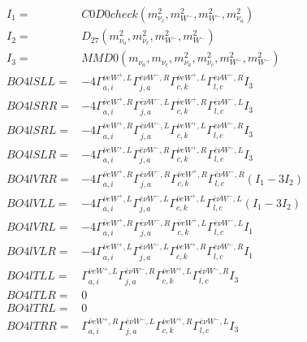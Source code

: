 \documentclass[A4,landscape]{article}
\begin{document}
\begin{align} 
I_1 = & C0D0check(m^2_{\nu_{{c}}}, m^2_{W^-}, m^2_{W^-}, m^2_{\nu_{{a}}}) \\ 
I_2 = & D_{27}(m^2_{\nu_{{a}}}, m^2_{\nu_{{c}}}, m^2_{W^-}, m^2_{W^-}) \\ 
I_3 = & MMD0(m_{\nu_{{a}}}, m_{\nu_{{c}}}, m^2_{\nu_{{a}}}, m^2_{\nu_{{c}}}, m^2_{W^-}, m^2_{W^-}) \\ 
  BO4lSLL= & -4  \Gamma^{\bar{\nu}e W^+,L}_{a, i} \Gamma^{\bar{e}\nu W^- ,R}_{j, a} \Gamma^{\bar{\nu}e W^+,L}_{c, k} \Gamma^{\bar{e}\nu W^- ,R}_{l, c} I_3 \\ 
  BO4lSRR= & -4  \Gamma^{\bar{\nu}e W^+,R}_{a, i} \Gamma^{\bar{e}\nu W^- ,L}_{j, a} \Gamma^{\bar{\nu}e W^+,R}_{c, k} \Gamma^{\bar{e}\nu W^- ,L}_{l, c} I_3 \\ 
  BO4lSRL= & -4  \Gamma^{\bar{\nu}e W^+,R}_{a, i} \Gamma^{\bar{e}\nu W^- ,L}_{j, a} \Gamma^{\bar{\nu}e W^+,L}_{c, k} \Gamma^{\bar{e}\nu W^- ,R}_{l, c} I_3 \\ 
  BO4lSLR= & -4  \Gamma^{\bar{\nu}e W^+,L}_{a, i} \Gamma^{\bar{e}\nu W^- ,R}_{j, a} \Gamma^{\bar{\nu}e W^+,R}_{c, k} \Gamma^{\bar{e}\nu W^- ,L}_{l, c} I_3 \\ 
  BO4lVRR= & -4  \Gamma^{\bar{\nu}e W^+,R}_{a, i} \Gamma^{\bar{e}\nu W^- ,R}_{j, a} \Gamma^{\bar{\nu}e W^+,R}_{c, k} \Gamma^{\bar{e}\nu W^- ,R}_{l, c} (I_1 - 3 I_2) \\ 
  BO4lVLL= & -4  \Gamma^{\bar{\nu}e W^+,L}_{a, i} \Gamma^{\bar{e}\nu W^- ,L}_{j, a} \Gamma^{\bar{\nu}e W^+,L}_{c, k} \Gamma^{\bar{e}\nu W^- ,L}_{l, c} (I_1 - 3 I_2) \\ 
  BO4lVRL= & -4  \Gamma^{\bar{\nu}e W^+,R}_{a, i} \Gamma^{\bar{e}\nu W^- ,R}_{j, a} \Gamma^{\bar{\nu}e W^+,L}_{c, k} \Gamma^{\bar{e}\nu W^- ,L}_{l, c} I_1 \\ 
  BO4lVLR= & -4  \Gamma^{\bar{\nu}e W^+,L}_{a, i} \Gamma^{\bar{e}\nu W^- ,L}_{j, a} \Gamma^{\bar{\nu}e W^+,R}_{c, k} \Gamma^{\bar{e}\nu W^- ,R}_{l, c} I_1 \\ 
  BO4lTLL= &  \Gamma^{\bar{\nu}e W^+,L}_{a, i} \Gamma^{\bar{e}\nu W^- ,R}_{j, a} \Gamma^{\bar{\nu}e W^+,L}_{c, k} \Gamma^{\bar{e}\nu W^- ,R}_{l, c} I_3 \\ 
  BO4lTLR= & 0 \\ 
  BO4lTRL= & 0 \\ 
  BO4lTRR= &  \Gamma^{\bar{\nu}e W^+,R}_{a, i} \Gamma^{\bar{e}\nu W^- ,L}_{j, a} \Gamma^{\bar{\nu}e W^+,R}_{c, k} \Gamma^{\bar{e}\nu W^- ,L}_{l, c} I_3 \\ 
\end{align} 
\end{document}

